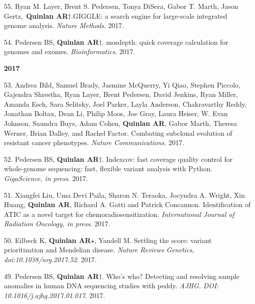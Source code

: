 \documentclass[margin,line]{cv}
\begin{document}
\begin{resume}
\begin{list}{*}{}
    \item[55.] Ryan M. Layer, Brent S. Pedersen, Tonya DiSera, Gabor T. Marth, Jason Gertz, \textbf{Quinlan AR}$\dagger$.GIGGLE: a search engine for large-scale integrated genome analysis. \emph{Nature Methods}. 2017.

    \item[54.] Pedersen BS, \textbf{Quinlan AR}$\dagger$.
    mosdepth: quick coverage calculation for genomes and exomes. \emph{Bioinformatics}. 2017. 

    \end{list}
 

    \textbf{2017} \\

    \begin{list}{*}{}

    \item[53.] Andrea Bild, Samuel Brady, Jasmine McQuerry, Yi Qiao, Stephen Piccolo, Gajendra Shrestha, Ryan Layer, Brent Pedersen, David Jenkins, Ryan Miller, Amanda Esch, Sara Selitsky, Joel Parker, Layla Anderson, Chakravarthy Reddy, Jonathan Boltax, Dean Li, Philip Moos, Joe Gray, Laura Heiser, W. Evan Johnson, Saundra Buys, Adam Cohen,  \textbf{Quinlan AR}, Gabor Marth, Theresa Werner, Brian Dalley, and Rachel Factor.
    Combating subclonal evolution of resistant cancer phenotypes. \emph{Nature Communications}. 2017.

    \item[52.] Pedersen BS, \textbf{Quinlan AR}$\dagger$.
    Indexcov: fast coverage quality control for whole-genome sequencing: fast, flexible variant analysis with Python. \emph{GigaScience, in press}. 2017. 

    \item[51.] Xiangfei Liu, Uma Devi Paila, Sharon N. Teraoka, Jocyndra A. Wright, Xin Huang, \textbf{Quinlan AR}, Richard A. Gatti and Patrick Concannon.
    Identification of ATIC as a novel target for chemoradiosensitization. \emph{International Journal of Radiation Oncology, in press}. 2017.

    \item[50.] Eilbeck K, \textbf{Quinlan AR}$\star$, Yandell M.
    Settling the score: variant prioritization and Mendelian disease. \emph{Nature Reviews Genetics, doi:10.1038/nrg.2017.52}. 2017.

    \item[49.] Pedersen BS, \textbf{Quinlan AR}$\dagger$.
    Who's who? Detecting and resolving sample anomalies in human DNA sequencing studies with peddy. \emph{AJHG. DOI: 10.1016/j.ajhg.2017.01.017}. 2017. 


\end{list}
\end{resume}
\end{document}
